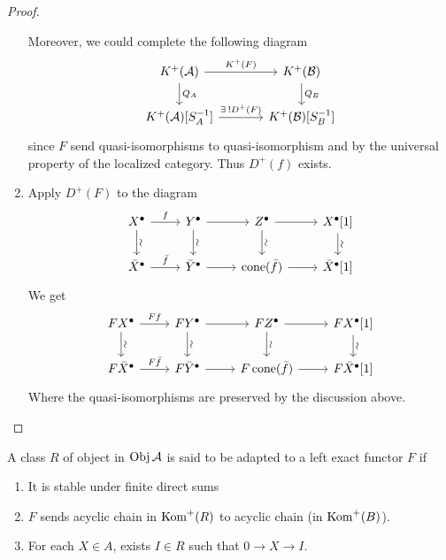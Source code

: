 \begin{prop}
\begin{proof}
\begin{enumerate}
        Moreover, we could complete the following diagram
        \[ \begin{tikzcd}[column sep=large]
            K^+(\Ac) \ar[r, "K^+(F)"] \ar[d, "Q_A"] &
            K^+(\Bc) \ar[d, "Q_B"] \\
            K^+(\Ac)[S_A^{-1}] \ar[r, "\exists ! D^+(F)"] & K^+(\Bc)[S_B^{-1}]
          \end{tikzcd} \]
        since $F$ send quasi-isomorphisms to quasi-isomorphism
        and by the universal property of the localized category.
        Thus $D^+(f)$ exists.
      \item Apply $D^+(F)$ to the diagram
        \[ \begin{tikzcd}
            X^\bullet \ar[r, "f"] \ar[d, "\rotatebox{90}{\(\sim\)}"] &
            Y^\bullet \ar[r] \ar[d, "\rotatebox{90}{\(\sim\)}"] &
            Z^\bullet \ar[r] \ar[d, "\rotatebox{90}{\(\sim\)}"] &
            X^\bullet[1] \ar[d, "\rotatebox{90}{\(\sim\)}"] \\
            \bar{X}^\bullet \ar[r, "\bar{f}"] &
            \bar{Y}^\bullet \ar[r] &
            \cone(\bar{f}) \ar[r] &
            \bar{X}^\bullet[1]
        \end{tikzcd} \]
        We get
        \[ \begin{tikzcd}
            F X^\bullet \ar[r, "F f"] \ar[d, "\rotatebox{90}{\(\sim\)}"] &
            F Y^\bullet \ar[r] \ar[d, "\rotatebox{90}{\(\sim\)}"] &
            F Z^\bullet \ar[r] \ar[d, "\rotatebox{90}{\(\sim\)}"] &
            F X^\bullet[1] \ar[d, "\rotatebox{90}{\(\sim\)}"] \\
            F \bar{X}^\bullet \ar[r, "F \bar{f}"] &
            F \bar{Y}^\bullet \ar[r] &
            F \cone(\bar{f}) \ar[r] &
            F \bar{X}^\bullet[1]
        \end{tikzcd} \]
        Where the quasi-isomorphisms are preserved by the discussion above.
    \end{enumerate}
  \end{proof}
\end{prop}

\begin{definition}
  A class $R$ of object in $\operatorname{Obj} \mathcal{A}$ is said to
  be adapted to a left exact functor $F$ if
  \begin{enumerate}
    \item It is stable under finite direct sums
    \item $F$ sends acyclic chain in $\operatorname{Kom}^+(R)$ to acyclic chain (in $\operatorname{Kom}^+(B)$).
    \item For each $X \in A$, exists $I \in R$ such that $0 \to X \to I$.
  \end{enumerate}
\end{definition}

